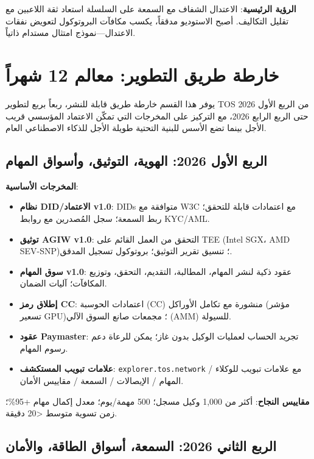 \documentclass[11pt]{article}
\begin{document}
\textbf{الرؤية الرئيسية}: الاعتدال الشفاف مع السمعة على السلسلة استعاد ثقة اللاعبين مع تقليل التكاليف. أصبح الاستوديو مدققاً، يكسب مكافآت البروتوكول لتعويض نفقات الاعتدال---نموذج امتثال مستدام ذاتياً.

\section{خارطة طريق التطوير: معالم 12 شهراً}
\label{sec:12month-roadmap}

يوفر هذا القسم خارطة طريق قابلة للنشر، ربعاً بربع لتطوير TOS من الربع الأول 2026 حتى الربع الرابع 2026، مع التركيز على المخرجات التي تمكّن الاعتماد المؤسسي قريب الأجل بينما تضع الأسس للبنية التحتية طويلة الأجل للذكاء الاصطناعي العام.

\subsection{الربع الأول 2026: الهوية، التوثيق، وأسواق المهام}

\textbf{المخرجات الأساسية}:
\begin{itemize}[noitemsep]
  \item \textbf{نظام DID/الاعتماد v1.0}: DIDs متوافقة مع W3C مع اعتمادات قابلة للتحقق؛ ربط السمعة؛ سجل المُصدرين مع روابط KYC/AML.
  \item \textbf{توثيق AGIW v1.0}: التحقق من العمل القائم على TEE (Intel SGX، AMD SEV-SNP)؛ تنسيق تقرير التوثيق؛ بروتوكول تسجيل المدقق.
  \item \textbf{سوق المهام v1.0}: عقود ذكية لنشر المهام، المطالبة، التقديم، التحقق، وتوزيع المكافآت؛ آليات الضمان.
  \item \textbf{إطلاق رمز CC}: اعتمادات الحوسبة (CC) منشورة مع تكامل الأوراكل (مؤشر تسعير GPU)؛ مجمعات صانع السوق الآلي (AMM) للسيولة.
  \item \textbf{عقود Paymaster}: تجريد الحساب لعمليات الوكيل بدون غاز؛ يمكن للرعاة دعم رسوم المهام.
  \item \textbf{علامات تبويب المستكشف}: \texttt{explorer.tos.network} مع علامات تبويب للوكلاء / المهام / الإيصالات / السمعة / مقاييس الأمان.
\end{itemize}

\textbf{مقاييس النجاح}: أكثر من 1,000 وكيل مسجل؛ 500 مهمة/يوم؛ معدل إكمال مهام +95\%؛ زمن تسوية متوسط <20 دقيقة.

\subsection{الربع الثاني 2026: السمعة، أسواق الطاقة، والأمان}
\end{document}
